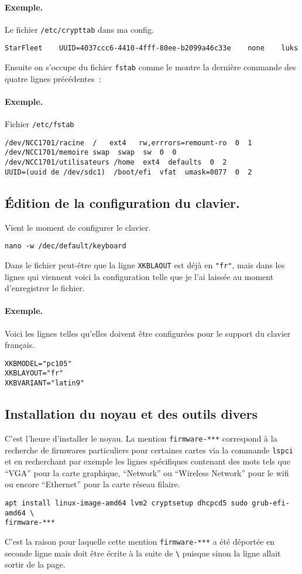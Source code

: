 \documentclass[12pt, a4paper]{article}
\begin{document}
\paragraph{Exemple.} Le fichier \texttt{/etc/crypttab} dans ma config.
\begin{verbatim}
StarFleet    UUID=4037ccc6-4410-4fff-80ee-b2099a46c33e    none    luks
\end{verbatim}

Ensuite on s'occupe du fichier \texttt{fstab} comme le montre la dernière commande des quatre lignes précédentes~:
\paragraph{Exemple.} Fichier \texttt{/etc/fstab}
\begin{verbatim}
/dev/NCC1701/racine  /   ext4   rw,errrors=remount-ro  0  1
/dev/NCC1701/memoire swap  swap  sw  0  0
/dev/NCC1701/utilisateurs /home  ext4  defaults  0  2
UUID=(uuid de /dev/sdc1)  /boot/efi  vfat  umask=0077  0  2
\end{verbatim}

\subsection{Édition de la configuration du clavier.}
Vient le moment de configurer le clavier.
\begin{verbatim}
nano -w /dec/default/keyboard
\end{verbatim}
Dans le fichier peut-être que la ligne \texttt{XKBLAOUT} est déjà en \texttt{"fr"}, mais dans les lignes qui viennent voici la configuration telle que je l'ai laissée au moment d'enregistrer le fichier.

\paragraph{Exemple.} Voici les lignes telles qu'elles doivent être configurées pour le support du clavier français.
\begin{verbatim}
XKBMODEL="pc105"
XKBLAYOUT="fr"
XKBVARIANT="latin9"
\end{verbatim}

\subsection{Installation du noyau et des outils divers}
C'est l'heure d'installer le noyau. 
La mention \texttt{firmware-***} correspond à la recherche de firmwares particuliers pour certaines cartes via la commande \texttt{lspci} et en recherchant par exemple les lignes spécifiques contenant des mots tels que ``VGA'' pour la carte graphique, ``Network'' ou ``Wireless Network'' pour le wifi ou encore ``Ethernet'' pour la carte réseau filaire.
\begin{verbatim}
apt install linux-image-amd64 lvm2 cryptsetup dhcpcd5 sudo grub-efi-amd64 \
firmware-***
\end{verbatim}
C'est la raison pour laquelle cette mention \texttt{firmware-***} a été déportée en seconde ligne mais doit être écrite à la suite de \verb|\| puisque sinon la ligne allait sortir de la page.
\end{document}
